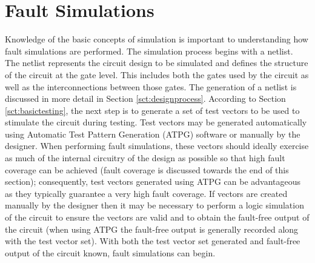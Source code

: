 \documentclass[12pt]{report}
\begin{document}
\section{Fault Simulations}
\label{sct:faultsim}
Knowledge of the basic concepts of simulation is important to understanding how fault simulations are performed.  The simulation process begins with a netlist.  The netlist represents the circuit design to be simulated and defines the structure of the circuit at the gate level.  This includes both the gates used by the circuit as well as the interconnections between those gates\cite{advancedverilog}.  The generation of a netlist is discussed in more detail in Section \ref{sct:designprocess}.  According to Section \ref{sct:basictesting}, the next step is to generate a set of test vectors to be used to stimulate the circuit during testing.  Test vectors may be generated automatically using Automatic Test Pattern Generation (ATPG) software \cite{advancedverilog} or manually by the designer.  When performing fault simulations, these vectors should ideally exercise as much of the internal circuitry of the design as possible so that high fault coverage can be achieved (fault coverage is discussed towards the end of this section); consequently, test vectors generated using  ATPG can be advantageous as they typically guarantee a very high fault coverage\cite{advancedverilog}.  If vectors are created manually by the designer then it may be necessary to perform a logic simulation of the circuit to ensure the vectors are valid and to obtain the fault-free output of the circuit (when using ATPG the fault-free output is generally recorded along with the test vector set).  With both the test vector set generated and fault-free output of the circuit known, fault simulations can begin.  
\end{document}
